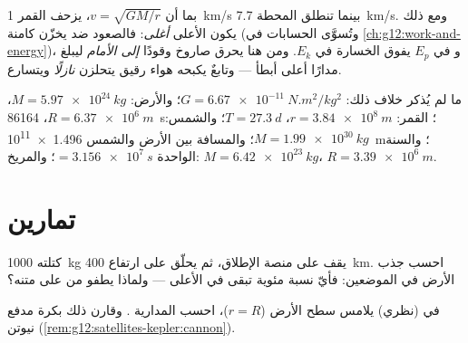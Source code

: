 \begin{remark}\label{rem:g12:satellites-kepler:energy}
بما أن $v = \sqrt{GM/r}$، يزحف القمر  \qty{1}{km/s} بينما تنطلق
المحطة  \qty{7.7}{km/s}. ومع ذلك يكون  الأعلى
\emph{أغلى}: فالصعود ضد  يخزّن  كامنة
(وتُسوَّى الحسابات في \cref{ch:g12:work-and-energy})، و
 في $E_p$ يفوق الخسارة في $E_k$. ومن هنا يحرق صاروخ وقودًا
\emph{إلى الأمام} ليبلغ مدارًا أعلى أبطأ --- وتابعٌ يكبحه هواء رقيق
يتحلزن \emph{نازلًا} ويتسارع.
\end{remark}

\begin{remark}\label{rem:g12:satellites-kepler:data}
ما لم يُذكر خلاف ذلك: $G = \qty{6.67e-11}{N.m^2/kg^2}$؛ والأرض:
$M = \qty{5.97e24}{kg}$، $R = \qty{6.37e6}{m}$، 
\qty{86164}{s}؛  القمر: $r = \qty{3.84e8}{m}$، $T =
\qty{27.3}{d}$؛ والشمس: $M = \qty{1.99e30}{kg}$؛ والمسافة بين الأرض والشمس
\qty{1.496e11}{m}؛ والسنة الواحدة $= \qty{3.156e7}{s}$؛ والمريخ: $M =
\qty{6.42e23}{kg}$، $R = \qty{3.39e6}{m}$.
\end{remark}

\section{تمارين}

\begin{exercise}[$\star$]\label{exo:g12:satellites-kepler:1}
 كتلته \qty{1000}{kg} يقف على منصة الإطلاق، ثم يحلّق على
ارتفاع \qty{400}{km}. احسب جذب الأرض في الموضعين:
فأيّ نسبة مئوية تبقى في الأعلى --- ولماذا يطفو من على متنه؟
\end{exercise}

\begin{exercise}[$\star$]\label{exo:g12:satellites-kepler:2}
في  (نظري) يلامس سطح الأرض
($r = R$)، احسب  المدارية . وقارن ذلك بكرة
مدفع نيوتن (\cref{rem:g12:satellites-kepler:cannon}).
\end{exercise}

